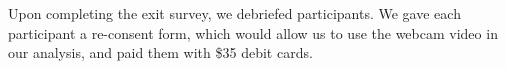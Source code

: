 \documentclass{sigchi}
\newenvironment{packed_enum}{
\begin{enumerate}
  \setlength{\itemsep}{1pt}
  \setlength{\parskip}{0pt}
  \setlength{\parsep}{0pt}
}{\end{enumerate}}
\newenvironment{packed_item}{
\begin{itemize}
  \setlength{\itemsep}{1pt}
  \setlength{\parskip}{0pt}
  \setlength{\parsep}{0pt}
}{\end{itemize}}
\begin{document}
\begin{packed_enum}
\item Upon completing the exit survey, we debriefed participants. We gave each participant a re-consent form, which would allow us to use the webcam video in our analysis, and paid them with \$35 debit cards.
\end{packed_enum}
\end{document}
